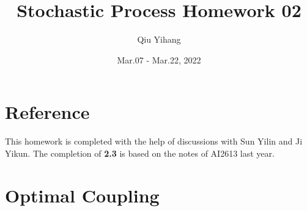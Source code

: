 \documentclass{article}
\title{\textbf{Stochastic Process Homework 02}}
\author{Qiu Yihang}
\date{Mar.07 - Mar.22, 2022}
\begin{document}
\maketitle

\setcounter{section}{-1}
\section{Reference}
\hspace{2em}
This homework is completed with the help of discussions with Sun Yilin and Ji Yikun. The completion of \textbf{2.3} is based on the notes of AI2613 last year.

\section{Optimal Coupling}
\vspace{1em}
\end{document}
